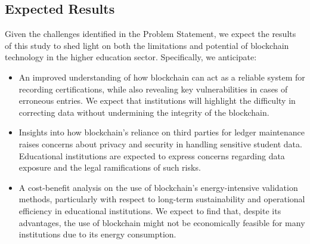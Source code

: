 \documentclass[a4paper, 12pt]{article}
\begin{document}
\subsection{Expected Results}
Given the challenges identified in the Problem Statement, we expect the results of this study to shed light on both the limitations and potential of blockchain technology in the higher education sector. Specifically, we anticipate:
\begin{itemize}
    \item An improved understanding of how blockchain can act as a reliable system for recording certifications, while also revealing key vulnerabilities in cases of erroneous entries. We expect that institutions will highlight the difficulty in correcting data without undermining the integrity of the blockchain.
    \item Insights into how blockchain's reliance on third parties for ledger maintenance raises concerns about privacy and security in handling sensitive student data. Educational institutions are expected to express concerns regarding data exposure and the legal ramifications of such risks.
    \item A cost-benefit analysis on the use of blockchain's energy-intensive validation methods, particularly with respect to long-term sustainability and operational efficiency in educational institutions. We expect to find that, despite its advantages, the use of blockchain might not be economically feasible for many institutions due to its energy consumption.
\end{itemize}
\end{document}
